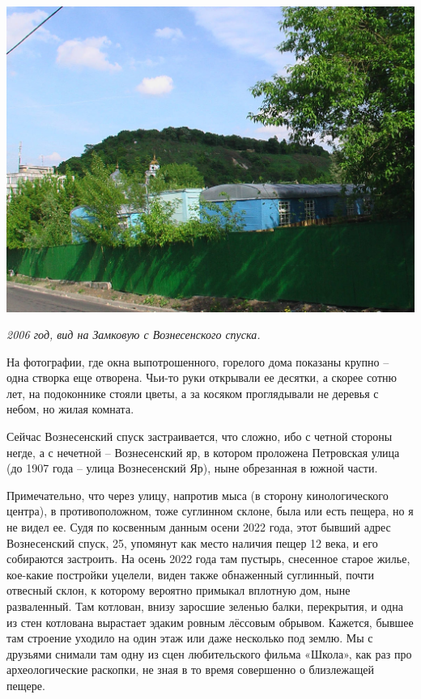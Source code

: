 \begin{center}
\includegraphics[width=\linewidth]{chast-colebanie-osnov/gora-zamkovaya-valovaya/s_imga0041.jpg}

\textit{2006 год, вид на Замковую с Вознесенского спуска.}
\end{center}

На фотографии, где окна выпотрошенного, горелого дома показаны крупно – одна створка еще отворена. Чьи-то руки открывали ее десятки, а скорее сотню лет, на подоконнике стояли цветы, а за косяком проглядывали не деревья с небом, но жилая комната. 

Сейчас Вознесенский спуск застраивается, что сложно, ибо с четной стороны негде, а с нечетной – Вознесенский яр, в котором проложена Петровская улица (до 1907 года – улица Вознесенский Яр), ныне обрезанная в южной части.

Примечательно, что через улицу, напротив мыса (в сторону кинологического центра), в противоположном, тоже суглинном склоне, была или есть пещера, но я не видел ее. Судя по косвенным данным осени 2022 года, этот бывший адрес Вознесенский спуск, 25, упомянут как место наличия пещер 12 века, и его собираются застроить. На осень 2022 года там пустырь, снесенное старое жилье, кое-какие постройки уцелели, виден также обнаженный суглинный, почти отвесный склон, к которому вероятно примыкал вплотную дом, ныне разваленный. Там котлован, внизу заросшие зеленью балки, перекрытия, и одна из стен котлована вырастает эдаким ровным лёссовым обрывом. Кажется, бывшее там строение уходило на один этаж или даже несколько под землю. Мы с друзьями снимали там одну из сцен любительского фильма «Школа», как раз про археологические раскопки, не зная в то время совершенно о близлежащей пещере.

